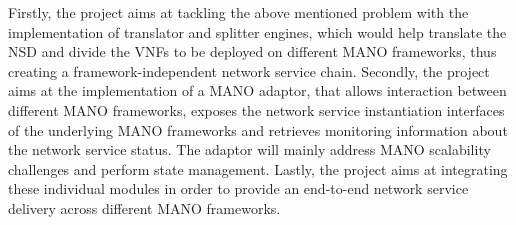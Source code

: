 Firstly, the project aims at tackling the above mentioned problem with the implementation of translator and splitter engines, which would help translate the NSD and divide the VNFs to be deployed on different MANO frameworks, thus creating a framework-independent network service chain. Secondly, the project aims at the implementation of a MANO adaptor, that allows interaction between different MANO frameworks, exposes the network service instantiation interfaces of the underlying MANO frameworks and retrieves monitoring information about the network service status. The adaptor will mainly address MANO scalability challenges and perform state management. Lastly, the project aims at integrating these individual modules in order to provide an end-to-end network service delivery across different MANO frameworks.



